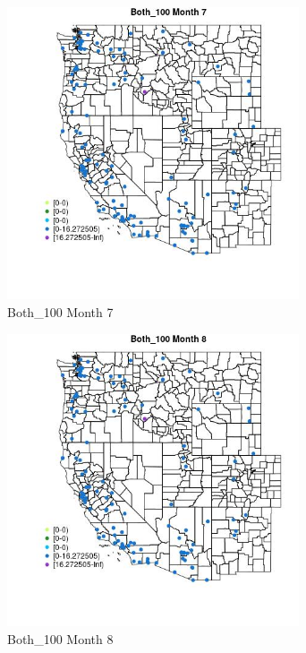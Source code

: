 \begin{figure} 
\centering  
\includegraphics[width=0.77\textwidth]{Code_Outputs/Report_ML_input_PM25_Step4_part_e_de_duplicated_aves_MapObsMo7Both_100.jpg} 
\caption{\label{fig:Report_ML_input_PM25_Step4_part_e_de_duplicated_avesMapObsMo7Both_100}Both_100 Month 7} 
\end{figure} 
 

\begin{figure} 
\centering  
\includegraphics[width=0.77\textwidth]{Code_Outputs/Report_ML_input_PM25_Step4_part_e_de_duplicated_aves_MapObsMo8Both_100.jpg} 
\caption{\label{fig:Report_ML_input_PM25_Step4_part_e_de_duplicated_avesMapObsMo8Both_100}Both_100 Month 8} 
\end{figure} 
 

